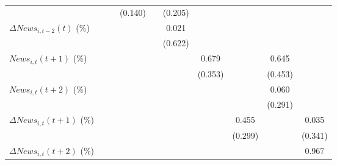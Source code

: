{\begin{tabular}{l*{9}{c}}
                    &                     &                     &     (0.140)         &                     &     (0.205)         &                     &                     &                     &                     \\
\addlinespace
$ \Delta News_{i,t-2}(t)$ (\%)&                     &                     &                     &                     &       0.021         &                     &                     &                     &                     \\
                    &                     &                     &                     &                     &     (0.622)         &                     &                     &                     &                     \\
\addlinespace
$ News_{i,t}(t+1)$ (\%)&                     &                     &                     &                     &                     &       0.679\sym{*}  &                     &       0.645         &                     \\
                    &                     &                     &                     &                     &                     &     (0.353)         &                     &     (0.453)         &                     \\
\addlinespace
$ News_{i,t}(t+2)$ (\%)&                     &                     &                     &                     &                     &                     &                     &       0.060         &                     \\
                    &                     &                     &                     &                     &                     &                     &                     &     (0.291)         &                     \\
\addlinespace
$ \Delta News_{i,t}(t+1)$ (\%)&                     &                     &                     &                     &                     &                     &       0.455         &                     &       0.035         \\
                    &                     &                     &                     &                     &                     &                     &     (0.299)         &                     &     (0.341)         \\
\addlinespace
$ \Delta News_{i,t}(t+2)$ (\%)&                     &                     &                     &                     &                     &                     &                     &                     &       0.967\sym{*}  \\

\end{tabular}}
